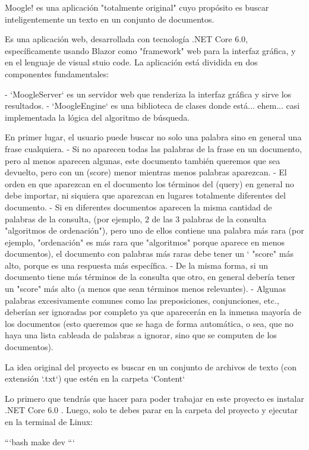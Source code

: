 \documentclass{article}
\begin{document}
Moogle! es una aplicación "totalmente original" cuyo propósito es buscar inteligentemente un texto en un conjunto de documentos.

Es una aplicación web, desarrollada con tecnología .NET Core 6.0, específicamente usando Blazor como "framework" web para la interfaz gráfica, y en el lenguaje de visual stuio code.
La aplicación está dividida en dos componentes fundamentales:

- `MoogleServer` es un servidor web que renderiza la interfaz gráfica y sirve los resultados.
- `MoogleEngine` es una biblioteca de clases donde está... ehem... casi implementada la lógica del algoritmo de búsqueda.

 En primer lugar, el usuario puede buscar no solo una palabra sino en general una frase cualquiera.
- Si no aparecen todas las palabras de la frase en un documento, pero al menos aparecen algunas, este documento también queremos que sea devuelto, pero con un (score) menor mientras menos palabras aparezcan.
- El orden en que aparezcan en el documento los términos del (query) en general no debe importar, ni siquiera que aparezcan en lugares totalmente diferentes del documento.
- Si en diferentes documentos aparecen la misma cantidad de palabras de la consulta, (por ejemplo, 2 de las 3 palabras de la consulta "algoritmos de ordenación"), pero uno de ellos contiene una palabra más rara (por ejemplo, "ordenación" es más rara que "algoritmos" porque aparece en menos documentos), el documento con palabras más raras debe tener un `
"score" más alto, porque es una respuesta más específica.
- De la misma forma, si un documento tiene más términos de la consulta que otro, en general debería tener un "score" más alto (a menos que sean términos menos relevantes).
- Algunas palabras excesivamente comunes como las preposiciones, conjunciones, etc., deberían ser ignoradas por completo ya que aparecerán en la inmensa mayoría de los documentos (esto queremos que se haga de forma automática, o sea, que no haya una lista cableada de palabras a ignorar, sino que se computen de los documentos).

La idea original del proyecto es buscar en un conjunto de archivos de texto (con extensión `.txt`) que estén en la carpeta `Content`


Lo primero que tendrás que hacer para poder trabajar en este proyecto es instalar .NET Core 6.0 . Luego, solo te debes parar en la carpeta del proyecto y ejecutar en la terminal de Linux:

```bash
make dev
```
\end{document}
